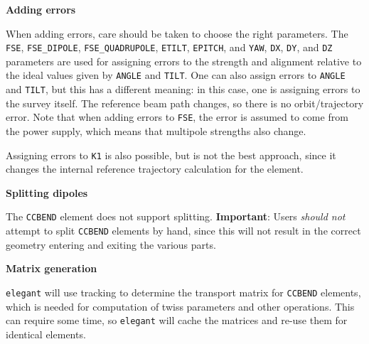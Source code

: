 {\bf Adding errors}

When adding errors, care should be taken to choose the right
parameters.  The \verb|FSE|, \verb|FSE_DIPOLE|, \verb|FSE_QUADRUPOLE|, \verb|ETILT|, \verb|EPITCH|, and
\verb|YAW|, \verb|DX|, \verb|DY|, and \verb|DZ| parameters are used for
assigning errors to the strength and alignment relative to the ideal
values given by \verb|ANGLE| and \verb|TILT|.  One can also assign 
errors to \verb|ANGLE| and \verb|TILT|, but this has a different meaning:
in this case, one is assigning errors to the survey itself.  The reference
beam path changes, so there is no orbit/trajectory error.  Note that when
adding errors to \verb|FSE|, the error is assumed to come from the power
supply, which means that multipole strengths also change.

Assigning errors to \verb|K1| is also possible, but is not the best approach, since
it changes the internal reference trajectory calculation for the element.

{\bf Splitting dipoles}

The \verb|CCBEND| element does not support splitting.
{\bf Important}: Users {\em should not} attempt to split \verb|CCBEND| elements by hand, since this
will not result in the correct geometry entering and exiting the various parts.

{\bf Matrix generation}

{\tt elegant} will use tracking to determine the transport matrix for \verb|CCBEND| elements, which 
is needed for computation of twiss parameters and other operations.
This can require some time, so {\tt elegant} will cache the matrices and re-use them for
identical elements.


